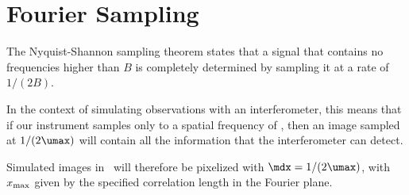\section{Fourier Sampling}

The Nyquist-Shannon sampling theorem states that a signal that contains
no frequencies higher than $B$ is completely determined by sampling it
at a rate of $1/(2B)$.  

In the context of simulating observations with an interferometer, this
means that if our instrument samples only to a spatial frequency of
\math{\umax}, then an image sampled at $1/({2\umax})$ will contain all the
information that the interferometer can detect.
 
Simulated images in \climax\ will therefore be pixelized with $\mdx =
1/({2\umax})$, with $x_{\rm max}$ given by the specified correlation
length in the Fourier plane.

